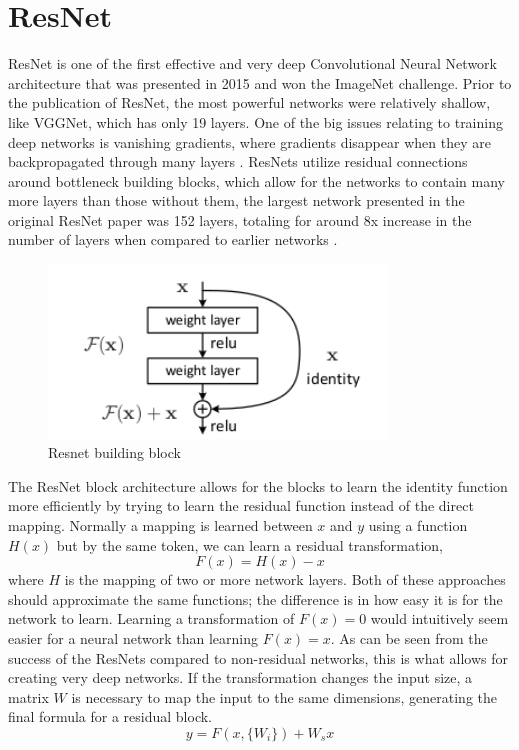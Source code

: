 \section{ResNet}
ResNet is one of the first effective and very deep Convolutional Neural Network architecture that was presented in 2015 and won the ImageNet challenge. Prior to the publication of ResNet, the most powerful networks were relatively shallow, like VGGNet, which has only 19 layers. One of the big issues relating to training deep networks is vanishing gradients, where gradients disappear when they are backpropagated through many layers \citep{wideResNet}. ResNets utilize residual connections around bottleneck building blocks, which allow for the networks to contain many more layers than those without them, the largest network presented in the original ResNet paper was 152 layers, totaling for around 8x increase in the number of layers when compared to earlier networks \citep{resNet}.

\begin{figure}[h!] 
\centering 
\includegraphics[width=0.8\textwidth]{imgs/resnet-block.png}
\caption{Resnet building block \citep{resNet}}
\end{figure}

The ResNet block architecture allows for the blocks to learn the identity function more efficiently by trying to learn the residual function instead of the direct mapping. Normally a mapping is learned between ${x}$ and ${y}$ using a function ${H(x)}$ but by the same token, we can learn a residual transformation, \[{F(x) = H(x) - x}\] \noindent where ${H}$ is the mapping of two or more network layers. Both of these approaches should approximate the same functions; the difference is in how easy it is for the network to learn. Learning a transformation of ${F(x) = 0}$ would intuitively seem easier for a neural network than learning ${F(x) = x}$. As can be seen from the success of the ResNets compared to non-residual networks, this is what allows for creating very deep networks. If the transformation changes the input size, a matrix ${W}$ is necessary to map the input to the same dimensions, generating the final formula for a residual block. \[y = F(x, \{W_i\}) + W_s x\]

